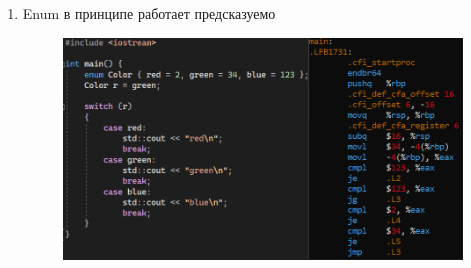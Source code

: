 \documentclass[a4paper,12pt]{article}
\begin{document}
\begin{enumerate}
\item Enum в принципе работает предсказуемо

\begin{figure}[H]
  \centering
  \includegraphics[width=1\linewidth]{images/asm6_8.png}
\end{figure}

\end{enumerate}
\end{document}

